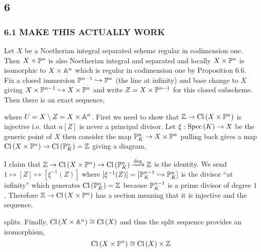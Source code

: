 \documentclass[12pt]{article}
\begin{document}
\subsection{6}

\subsubsection{6.1 MAKE THIS ACTUALLY WORK}

Let $X$ be a Noetherian integral separated scheme regular in codimension one. Then $X \times \P^n$ is also Noetherian integral and separated and locally $X \times \P^n$ is isomorphic to $X \times \A^n$ which is regular in codimension one by Proposition 6.6. Fix a closed immersion $\P^{n-1} \embed \P^n$ (the line at infinity) and base change to $X$ giving $X \times \P^{n-1} \embed X \times \P^n$ and write $Z = X \times \P^{n-1}$ for this closed subscheme. Then there is an exact sequence,
\begin{center}
\end{center}
where $U = X \setminus Z = X \times \A^n$. First we need to show that $\Z \to \Cl{X \times \P^n}$ is injective i.e. that $n [Z]$ is never a principal divisor. Let $\xi : \Spec{K} \to X$ be the generic point of $X$ then consider the map $\P^n_K \to X \times \P^n$ pulling back gives a map $\Cl{X \times \P^n} \to \Cl{\P^n_K} = \Z$ giving a diagram,
\begin{center}
\end{center}
I claim that $\Z \to \Cl{X \times \P^n} \to \Cl{\P^n_K} \xrightarrow{\deg} \Z$ is the identity. We send $1 \mapsto [Z] \mapsto [\xi^{-1}(Z)]$ where $[\xi^{-1}(Z)] = [\P^{n-1}_K \embed \P^n_K]$ is the divisor ``at infinity'' which generates $\Cl{\P^n_K} = \Z$ because $\P^{n-1}_K$ is a prime divisor of degree $1$. Therefore $\Z \to \Cl{X \times \P^n}$ has a section meaning that it is injective and the sequence,
\begin{center}
\end{center}
splits. Finally, $\Cl{X \times \A^n} \cong \Cl{X}$ and thus the split sequence provides an isomorphism, 
\[ \Cl{X \times \P^n} \cong \Cl{X} \times \Z \]
\end{document}

